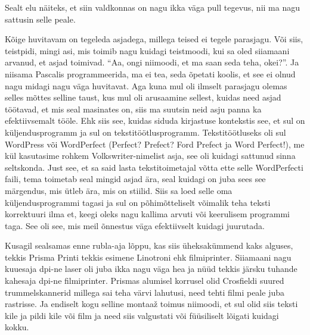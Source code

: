 Sealt elu näiteks, et siin valdkonnas on nagu ikka väga pull tegevus, nii ma nagu sattusin selle peale.


Kõige huvitavam on tegeleda asjadega, millega teised ei tegele parasjagu. Või siis, teistpidi, mingi asi, mis toimib nagu kuidagi teistmoodi, kui sa oled siiamaani  arvanud, et asjad toimivad. \enquote{Aa, ongi niimoodi, et ma saan seda teha, okei?}. Ja niisama Pascalis programmeerida, ma ei tea, seda õpetati koolis, et see ei olnud nagu midagi nagu väga huvitavat. Aga kuna mul oli ilmselt  parasjagu olemas selles mõttes selline taust, kus mul oli arusaamine sellest, kuidas need asjad töötavad, et mis seal masinates on,  siis ma suutsin neid asju panna ka efektiivsemalt tööle. Ehk siis see, kuidas siduda kirjastuse kontekstis see, et sul on  küljendusprogramm ja sul on tekstitöötlusprogramm. Tekstitöötluseks oli sul WordPress või WordPerfect (Perfect? Prefect? Ford Prefect ja Word Perfect!),  me kül kasutasime rohkem Volkswriter-nimelist asja, see oli kuidagi sattunud sinna seltskonda. Just see, et sa said lasta tekstitoimetajal võtta ette selle WordPerfecti faili, tema toimetab seal mingid asjad ära, seal kuidagi on juba sees see märgendus, mis ütleb ära, mis on  stiilid. Siis sa loed selle oma küljendusprogrammi tagasi ja sul on põhimõtteliselt võimalik teha teksti korrektuuri ilma et,  keegi oleks nagu kallima arvuti või keerulisem programmi taga. See oli see, mis meil õnnestus väga efektiivselt kuidagi juurutada. 

Kusagil sealsamas enne rubla-aja lõppu, kas siis üheksakümmend kaks alguses, tekkis Prisma Printi tekkis esimene Linotroni ehk filmiprinter. Siiamaani nagu kuuesaja dpi-ne laser oli juba ikka nagu väga hea ja nüüd tekkis järsku tuhande kahesaja dpi-ne filmiprinter. Prismas  alumisel korrusel olid Crosfieldi suured trummelskannerid millega sai teha värvi lahutusi, need tehti filmi peale juba rastrisse. Ja endiselt kogu selline montaaž toimus niimoodi, et sul olid siis teksti kile ja pildi kile või film ja need siis valgustati või füüsiliselt lõigati kuidagi kokku. 

